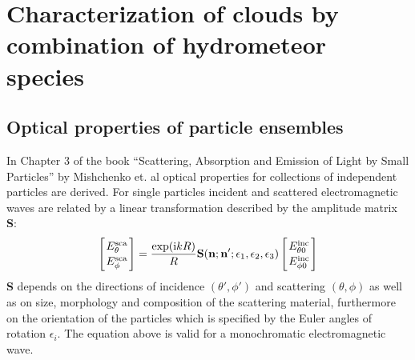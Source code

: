 \section{Characterization of clouds by combination of hydrometeor species}
\label{sec:scattering:hydrometeor_species}

\subsection{Optical properties of particle ensembles}
\label{sec:scattering:particle_ensembles}

In Chapter 3 of the book ``Scattering, Absorption and Emission of
Light by Small Particles'' by Mishchenko et. al \cite{Mishchenko:02}
optical properties for collections of independent particles are
derived.  For single particles incident and scattered electromagnetic
waves are related by a linear transformation described by the
amplitude matrix {\bf S}:
 \begin{eqnarray}
  \label{eq:ampl_matrix}
  \left[{E^{\rm sca}_{\theta}\atop E^{\rm sca}_{\phi}}\right] =
  \frac{\exp({\rm i} kR)}{R}{\bf S}({\bf n};{\bf
      n'};\epsilon_1,\epsilon_2,\epsilon_3)\left[{E^{\rm inc}_{\theta
          0}\atop E^{\rm inc}_{\phi 0}}\right] 
\end{eqnarray}
{\bf S} depends on the directions of incidence $(\theta', \phi')$ and
scattering $(\theta, \phi)$ as well as on size, morphology and
composition of the scattering material, furthermore on the orientation
of the particles which is specified by the Euler angles of rotation
$\epsilon _i$.  The equation above is valid for a monochromatic electromagnetic  wave.

